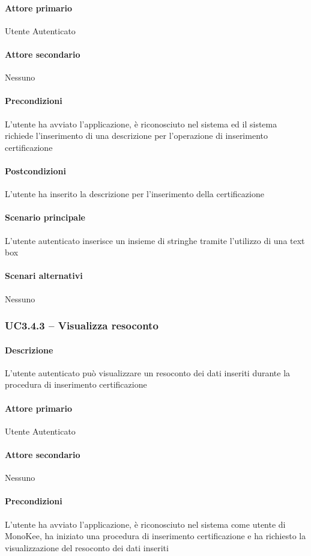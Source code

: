 \paragraph{Attore primario}  Utente Autenticato
\paragraph{Attore secondario}  Nessuno
\paragraph{Precondizioni} L’utente ha avviato l’applicazione, è riconosciuto nel sistema ed il sistema richiede l’inserimento di una descrizione per l’operazione di inserimento certificazione
\paragraph{Postcondizioni}  L’utente ha inserito la descrizione per l’inserimento della certificazione
\paragraph{Scenario principale}  
L’utente autenticato inserisce un insieme di stringhe tramite l’utilizzo di una text box
\paragraph{Scenari alternativi}  Nessuno




\subsubsection{UC3.4.3 – Visualizza resoconto}
\paragraph{Descrizione}  L’utente autenticato può visualizzare un resoconto dei dati inseriti durante la procedura di inserimento certificazione
\paragraph{Attore primario}  Utente Autenticato
\paragraph{Attore secondario}  Nessuno
\paragraph{Precondizioni} L’utente ha avviato l’applicazione, è riconosciuto nel sistema come utente di MonoKee, ha iniziato una procedura di inserimento certificazione e ha richiesto la visualizzazione del resoconto dei dati inseriti

